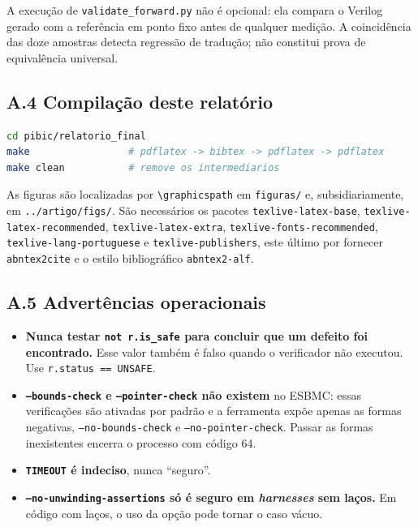 A execução de \texttt{validate\_forward.py} não é opcional: ela compara o Verilog gerado com
a referência em ponto fixo antes de qualquer medição. A coincidência das doze amostras detecta
regressão de tradução; não constitui prova de equivalência universal.

\subsection*{A.4 Compilação deste relatório}

\begin{lstlisting}[language=bash]
cd pibic/relatorio_final
make                 # pdflatex -> bibtex -> pdflatex -> pdflatex
make clean           # remove os intermediarios
\end{lstlisting}

As figuras são localizadas por \texttt{\textbackslash graphicspath} em \texttt{figuras/} e,
subsidiariamente, em \texttt{../artigo/figs/}. São necessários os pacotes
\texttt{texlive-latex-base}, \texttt{texlive-latex-recommended},
\texttt{texlive-latex-extra}, \texttt{texlive-fonts-recommended},
\texttt{texlive-lang-portuguese} e \texttt{texlive-publishers}, este último por fornecer
\texttt{abntex2cite} e o estilo bibliográfico \texttt{abntex2-alf}.

\subsection*{A.5 Advertências operacionais}

\begin{itemize}[leftmargin=1.4cm]
  \item \textbf{Nunca testar \texttt{not r.is\_safe} para concluir que um defeito foi
  encontrado.} Esse valor também é falso quando o verificador não executou. Use
  \texttt{r.status == UNSAFE}.
  \item \textbf{\texttt{--bounds-check} e \texttt{--pointer-check} não existem} no ESBMC:
  essas verificações são ativadas por padrão e a ferramenta expõe apenas as formas negativas,
  \texttt{--no-bounds-check} e \texttt{--no-pointer-check}. Passar as formas inexistentes
  encerra o processo com código 64.
  \item \textbf{\texttt{TIMEOUT} é indeciso}, nunca ``seguro''.
  \item \textbf{\texttt{--no-unwinding-assertions} só é seguro em \textit{harnesses} sem
  laços.} Em código com laços, o uso da opção pode tornar o caso vácuo.
\end{itemize}
